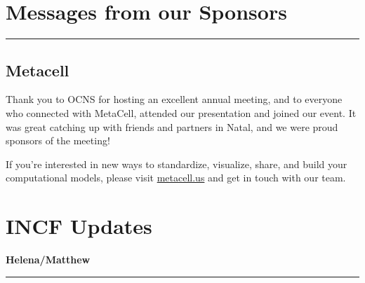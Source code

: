 \documentclass[11pt,a4paper,oneside]{article}
\begin{document}
\newpage
\section*{Messages from our Sponsors}%
\rule{\textwidth}{0.4pt}
\subsection*{Metacell}%
\begin{displayquote}
  Thank you to OCNS for hosting an excellent annual meeting, and to everyone who connected with MetaCell, attended our presentation and joined our event.
  It was great catching up with friends and partners in Natal, and we were proud sponsors of the meeting!

  If you're interested in new ways to standardize, visualize, share, and build your computational models, please visit \url{metacell.us} and get in touch with our team.
\end{displayquote}

\newpage
\section*{INCF Updates}%
\textbf{\large Helena/Matthew\\}
\rule{\textwidth}{0.4pt}
\lipsum[1-3]
\end{document}

